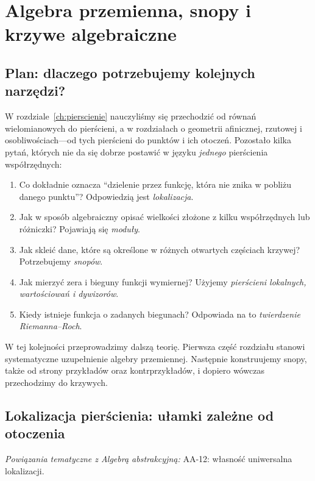 \chapter{Algebra przemienna, snopy i krzywe algebraiczne}
\label{ch:krzywe-snopy}

\providecommand{\atlasref}[2]{#2}


\section{Plan: dlaczego potrzebujemy kolejnych narzędzi?}
\label{sec:plan-krzywe}
W rozdziale~\ref{ch:pierscienie} nauczyliśmy się przechodzić od równań
wielomianowych do pierścieni, a w rozdziałach o geometrii afinicznej,
rzutowej i osobliwościach---od tych pierścieni do punktów i ich
otoczeń. Pozostało kilka pytań, których nie da się dobrze postawić
w języku \emph{jednego} pierścienia współrzędnych:
\begin{enumerate}[label=\arabic*)]
\item Co dokładnie oznacza ``dzielenie przez funkcję, która nie znika
w pobliżu danego punktu''? Odpowiedzią jest \emph{lokalizacja}.
\item Jak w sposób algebraiczny opisać wielkości złożone z kilku
współrzędnych lub różniczki? Pojawiają się \emph{moduły}.
\item Jak skleić dane, które są określone w różnych otwartych częściach
krzywej? Potrzebujemy \emph{snopów}.
\item Jak mierzyć zera i bieguny funkcji wymiernej? Użyjemy
\emph{pierścieni lokalnych, wartościowań i dywizorów}.
\item Kiedy istnieje funkcja o zadanych biegunach? Odpowiada na to
\emph{twierdzenie Riemanna--Roch}.
\end{enumerate}
W tej kolejności przeprowadzimy dalszą teorię. Pierwsza część
rozdziału stanowi systematyczne uzupełnienie algebry przemiennej.
Następnie konstruujemy snopy, także od strony przykładów oraz
kontrprzykładów, i dopiero wówczas przechodzimy do krzywych.

\section{Lokalizacja pierścienia: ułamki zależne od otoczenia}
\label{sec:lokalizacja}

\noindent\emph{Powiązania tematyczne z Algebrą abstrakcyjną:} \atlasref{AA-12::aa:tw:localization-universal}{AA-12: własność uniwersalna lokalizacji}.



